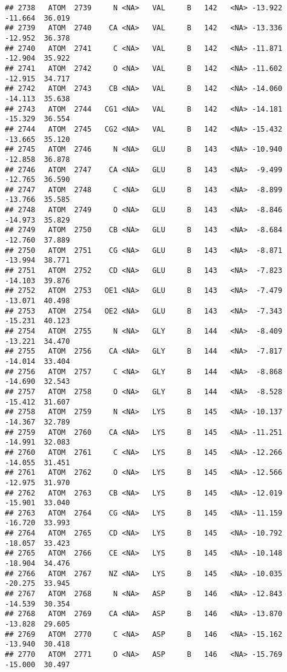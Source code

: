 \documentclass[
]{article}
\begin{document}
\begin{verbatim}
## 2738   ATOM  2739     N <NA>   VAL     B   142   <NA> -13.922 -11.664  36.019
## 2739   ATOM  2740    CA <NA>   VAL     B   142   <NA> -13.336 -12.952  36.378
## 2740   ATOM  2741     C <NA>   VAL     B   142   <NA> -11.871 -12.904  35.922
## 2741   ATOM  2742     O <NA>   VAL     B   142   <NA> -11.602 -12.915  34.717
## 2742   ATOM  2743    CB <NA>   VAL     B   142   <NA> -14.060 -14.113  35.638
## 2743   ATOM  2744   CG1 <NA>   VAL     B   142   <NA> -14.181 -15.329  36.554
## 2744   ATOM  2745   CG2 <NA>   VAL     B   142   <NA> -15.432 -13.665  35.120
## 2745   ATOM  2746     N <NA>   GLU     B   143   <NA> -10.940 -12.858  36.878
## 2746   ATOM  2747    CA <NA>   GLU     B   143   <NA>  -9.499 -12.765  36.590
## 2747   ATOM  2748     C <NA>   GLU     B   143   <NA>  -8.899 -13.766  35.585
## 2748   ATOM  2749     O <NA>   GLU     B   143   <NA>  -8.846 -14.973  35.829
## 2749   ATOM  2750    CB <NA>   GLU     B   143   <NA>  -8.684 -12.760  37.889
## 2750   ATOM  2751    CG <NA>   GLU     B   143   <NA>  -8.871 -13.994  38.771
## 2751   ATOM  2752    CD <NA>   GLU     B   143   <NA>  -7.823 -14.103  39.876
## 2752   ATOM  2753   OE1 <NA>   GLU     B   143   <NA>  -7.479 -13.071  40.498
## 2753   ATOM  2754   OE2 <NA>   GLU     B   143   <NA>  -7.343 -15.231  40.123
## 2754   ATOM  2755     N <NA>   GLY     B   144   <NA>  -8.409 -13.221  34.470
## 2755   ATOM  2756    CA <NA>   GLY     B   144   <NA>  -7.817 -14.014  33.404
## 2756   ATOM  2757     C <NA>   GLY     B   144   <NA>  -8.868 -14.690  32.543
## 2757   ATOM  2758     O <NA>   GLY     B   144   <NA>  -8.528 -15.412  31.607
## 2758   ATOM  2759     N <NA>   LYS     B   145   <NA> -10.137 -14.367  32.789
## 2759   ATOM  2760    CA <NA>   LYS     B   145   <NA> -11.251 -14.991  32.083
## 2760   ATOM  2761     C <NA>   LYS     B   145   <NA> -12.266 -14.055  31.451
## 2761   ATOM  2762     O <NA>   LYS     B   145   <NA> -12.566 -12.975  31.970
## 2762   ATOM  2763    CB <NA>   LYS     B   145   <NA> -12.019 -15.901  33.040
## 2763   ATOM  2764    CG <NA>   LYS     B   145   <NA> -11.159 -16.720  33.993
## 2764   ATOM  2765    CD <NA>   LYS     B   145   <NA> -10.792 -18.057  33.423
## 2765   ATOM  2766    CE <NA>   LYS     B   145   <NA> -10.148 -18.904  34.476
## 2766   ATOM  2767    NZ <NA>   LYS     B   145   <NA> -10.035 -20.275  33.945
## 2767   ATOM  2768     N <NA>   ASP     B   146   <NA> -12.843 -14.539  30.354
## 2768   ATOM  2769    CA <NA>   ASP     B   146   <NA> -13.870 -13.828  29.605
## 2769   ATOM  2770     C <NA>   ASP     B   146   <NA> -15.162 -13.940  30.418
## 2770   ATOM  2771     O <NA>   ASP     B   146   <NA> -15.769 -15.000  30.497

\end{verbatim}
\end{document}
